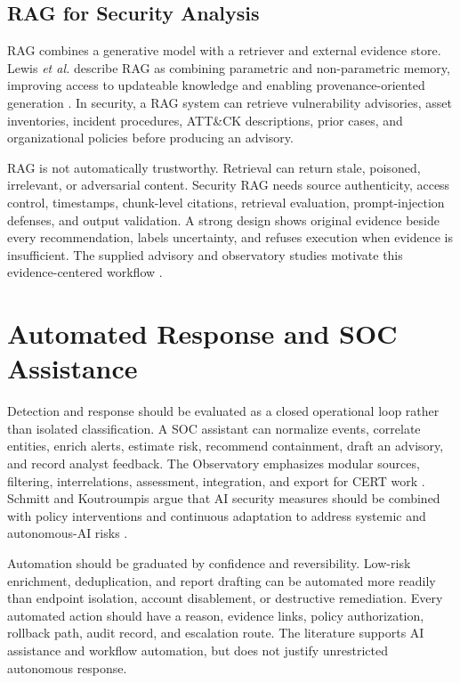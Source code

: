 \documentclass[conference]{IEEEtran}
\begin{document}
\subsection{RAG for Security Analysis}
RAG combines a generative model with a retriever and external evidence store. Lewis \emph{et al.} describe RAG as combining parametric and non-parametric memory, improving access to updateable knowledge and enabling provenance-oriented generation \cite{Lewis2020}. In security, a RAG system can retrieve vulnerability advisories, asset inventories, incident procedures, ATT\&CK descriptions, prior cases, and organizational policies before producing an advisory.

RAG is not automatically trustworthy. Retrieval can return stale, poisoned, irrelevant, or adversarial content. Security RAG needs source authenticity, access control, timestamps, chunk-level citations, retrieval evaluation, prompt-injection defenses, and output validation. A strong design shows original evidence beside every recommendation, labels uncertainty, and refuses execution when evidence is insufficient. The supplied advisory and observatory studies motivate this evidence-centered workflow \cite{Kaufhold2022,Abeywardena2023,Liu2025}.

\section{Automated Response and SOC Assistance}
Detection and response should be evaluated as a closed operational loop rather than isolated classification. A SOC assistant can normalize events, correlate entities, enrich alerts, estimate risk, recommend containment, draft an advisory, and record analyst feedback. The Observatory emphasizes modular sources, filtering, interrelations, assessment, integration, and export for CERT work \cite{Kaufhold2022}. Schmitt and Koutroumpis argue that AI security measures should be combined with policy interventions and continuous adaptation to address systemic and autonomous-AI risks \cite{Schmitt2025}.

Automation should be graduated by confidence and reversibility. Low-risk enrichment, deduplication, and report drafting can be automated more readily than endpoint isolation, account disablement, or destructive remediation. Every automated action should have a reason, evidence links, policy authorization, rollback path, audit record, and escalation route. The literature supports AI assistance and workflow automation, but does not justify unrestricted autonomous response.
\end{document}
